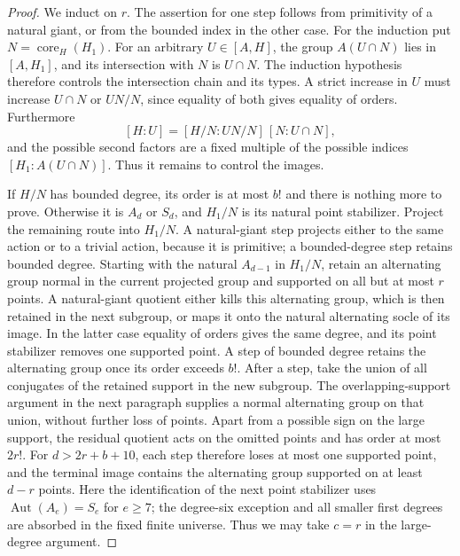 \begin{proof}
We induct on $r$.  The assertion for one step follows from primitivity
of a natural giant, or from the bounded index in the other case.
For the induction put $N=\operatorname{core}_H(H_1)$.  For an
arbitrary $U\in[A,H]$, the group $A(U\cap N)$ lies in $[A,H_1]$,
and its intersection with $N$ is $U\cap N$.  The induction hypothesis
therefore controls the intersection chain and its types.  A strict
increase in $U$ must increase $U\cap N$ or $UN/N$, since equality of
both gives equality of orders.  Furthermore
\[
 [H:U]=[H/N:UN/N]\,[N:U\cap N],
\]
and the possible second factors are a fixed multiple of the possible
indices $[H_1:A(U\cap N)]$.  Thus it remains to control the images.

If $H/N$ has bounded degree, its order is at most $b!$ and there is
nothing more to prove.  Otherwise it is $A_d$ or $S_d$, and $H_1/N$
is its natural point stabilizer.  Project the remaining route into
$H_1/N$.  A natural-giant step projects either to the same action or
to a trivial action, because it is primitive; a bounded-degree step
retains bounded degree.  Starting with the natural $A_{d-1}$ in
$H_1/N$, retain an alternating group normal in the current projected
group and supported on all but at most $r$ points.  A natural-giant
quotient either kills this alternating group, which is then retained
in the next subgroup, or maps it onto the natural alternating socle
of its image.  In the latter case equality of orders gives the same
degree, and its point stabilizer removes one supported point.
A step of bounded degree retains the alternating group once its
order exceeds $b!$.  After a step, take the union of all conjugates
of the retained support in the new subgroup.  The overlapping-support
argument in the next paragraph supplies a normal alternating group
on that union, without further loss of points.
Apart from a possible sign on the large support, the residual
quotient acts on the omitted points and has order at most $2r!$.
For $d>2r+b+10$, each step therefore loses at most one supported
point, and the terminal image contains the alternating group
supported on at least $d-r$ points.  Here the identification
of the next point stabilizer uses
$\operatorname{Aut}(A_e)=S_e$ for $e\geq7$; the degree-six exception
and all smaller first degrees are absorbed in the fixed finite
universe.  Thus we may take $c=r$ in the large-degree argument.


\end{proof}
